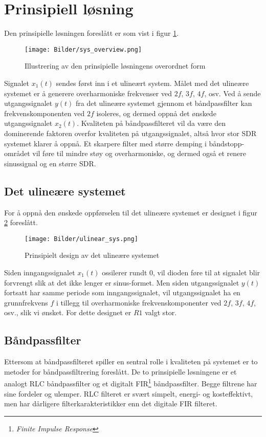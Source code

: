 \section{Prinsipiell løsning}
\label{prinsipiellLoesning}

Den prinsipielle løsningen foreslått er som vist i figur \ref{fig:prinsip_sys}.

\begin{figure}[H]
    \centering
    \texttt{[image: Bilder/sys\_overview.png]}
    \caption{Illustrering av den prinsipielle løsningens overordnet form}
    \label{fig:prinsip_sys}
\end{figure}

Signalet $x_1(t)$ sendes først inn i et ulineært system. Målet med det ulineære systemet 
er å generere overharmoniske frekvenser ved $2f$, $3f$, $4f$, osv. Ved å sende utgangssignalet 
$y(t)$ fra det ulineære systemet gjennom et båndpassfilter kan frekvenskomponenten ved $2f$ isoleres,
og dermed oppnå det ønskede utgangssignalet $x_2(t)$. Kvaliteten på båndpassfilteret vil da være den 
dominerende faktoren overfor kvaliteten på utgangssignalet, altså hvor stor SDR systemet klarer å oppnå.
Et skarpere filter med større demping i båndstopp-området vil føre til mindre støy og overharmoniske, 
og dermed også et renere sinussignal og en større SDR.

\subsection{Det ulineære systemet}
For å oppnå den ønskede oppførselen til det ulineære systemet er designet i figur \ref{fig:ulin_sys} foreslått.

\begin{figure}[H]
    \centering
    \texttt{[image: Bilder/ulinear\_sys.png]}
    \caption{Prinsipielt design av det ulineære systemet}
    \label{fig:ulin_sys}
\end{figure}

Siden inngangssignalet $x_1(t)$ ossilerer rundt 0, vil dioden føre til at signalet blir forvrengt slik at 
det ikke lenger er sinus-formet. Men siden utgangssignalet $y(t)$ fortsatt har samme periode som inngangssignalet,
vil utgangssignalet ha en grunnfrekvens $f$ i tillegg til overharmoniske frekvenskomponenter ved $2f$, $3f$, $4f$, osv., 
slik vi ønsket. For dette designet er $R1$ valgt stor.

\subsection{Båndpassfilter}
Ettersom at båndpassfilteret spiller en sentral rolle i kvaliteten på systemet er to metoder for 
båndpassfiltrering foreslått. De to prinsipielle løsningene er et analogt RLC båndpassfilter og et digitalt 
FIR\footnote{\textit{Finite Impulse Response}} båndpassfilter. Begge filtrene har sine fordeler og ulemper. RLC filteret 
er svært simpelt, energi- og kosteffektivt, men har dårligere filterkarakteristikker enn det digitale FIR filteret.


